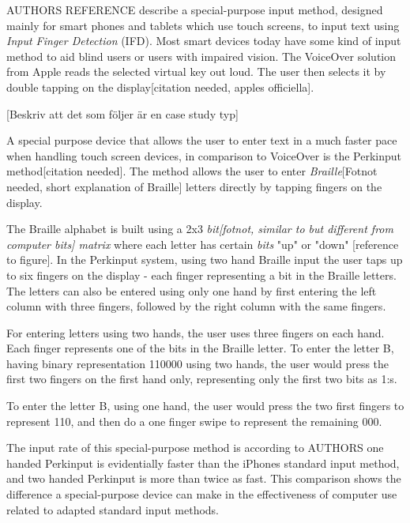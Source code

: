 
AUTHORS REFERENCE describe a special-purpose input method, designed mainly for smart phones and tablets which use touch screens, to input text using \emph{Input Finger Detection} (IFD). Most smart devices today have some kind of input method to aid blind users or users with impaired vision. The VoiceOver solution from Apple reads the selected virtual key out loud. The user then selects it by double tapping on the display[citation needed, apples officiella].

[Beskriv att det som följer är en case study typ]

A special purpose device that allows the user to enter text in a much faster pace when handling touch screen devices, in comparison to VoiceOver is the Perkinput method[citation needed]. The method allows the user to enter \emph{Braille}[Fotnot needed, short explanation of Braille] letters directly by tapping fingers on the display.

The Braille alphabet is built using a 2x3 \emph{bit[fotnot, similar to but different from computer bits] matrix} where each letter has certain \emph{bits} "up" or "down" [reference to figure]. In the Perkinput system, using two hand Braille input the user taps up to six fingers on the display - each finger representing a bit in the Braille letters. The letters can also be entered using only one hand by first entering the left column with three fingers, followed by the right column with the same fingers.

For entering letters using two hands, the user uses three fingers on each hand. Each finger represents one of the bits in the Braille letter. To enter the letter B, having binary representation 110000 using two hands, the user would press the first two fingers on the first hand only, representing only the first two bits as 1:s.

To enter the letter B, using one hand, the user would press the two first fingers to represent 110, and then do a one finger swipe to represent the remaining 000.

The input rate of this special-purpose method is according to AUTHORS one handed Perkinput is evidentially faster than the iPhones standard input method, and two handed Perkinput is more than twice as fast. This comparison shows the difference a special-purpose device can make in the effectiveness of computer use related to adapted standard input methods. 

